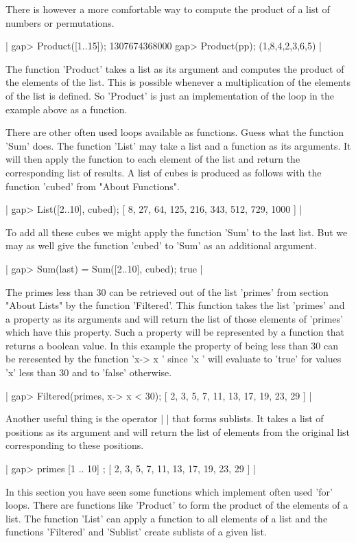 There is however a more comfortable way to  compute the product of a list
of numbers or permutations.

|    gap> Product([1..15]);
    1307674368000
    gap> Product(pp);
    (1,8,4,2,3,6,5) |

The function  'Product'  takes a  list as  its argument and computes  the
product  of  the  elements  of the  list.   This  is possible whenever  a
multiplication of  the elements of the list is defined.  So  'Product' is
just an implementation of the loop in the example above as a function.

There are other often used loops available as functions.   Guess what the
function 'Sum' does.  The function 'List' may  take a list and a function
as its arguments.  It will then apply the function to each element of the
list  and return  the corresponding list of results.   A list of cubes is
produced as follows with the function 'cubed' from "About Functions".

|    gap> List([2..10], cubed);
    [ 8, 27, 64, 125, 216, 343, 512, 729, 1000 ] |

To add all these cubes  we might apply the  function  'Sum' to  the  last
list.  But we may  as well  give the  function  'cubed' to  'Sum'  as  an
additional argument.

|    gap> Sum(last) = Sum([2..10], cubed);
    true |

The primes  less  than 30  can be retrieved out of the list 'primes' from
section "About Lists" by  the function 'Filtered'.   This  function takes
the list 'primes' and a  property  as its arguments  and will return  the
list  of those  elements  of 'primes'  which have  this property.  Such a
property will be  represented by a function that returns a boolean value.
In this example  the property of being less than 30  can be reresented by
the  function 'x-> x '  since 'x ' will evaluate  to 'true' for
values 'x' less than 30 and to 'false' otherwise.

|    gap> Filtered(primes, x-> x < 30);
    [ 2, 3, 5, 7, 11, 13, 17, 19, 23, 29 ] |

Another useful thing is the operator |{ }| that forms sublists.  It takes
a list of  positions as its argument and will return the list of elements
from the original list corresponding to these positions.

|    gap> primes{ [1 .. 10] };
    [ 2, 3, 5, 7, 11, 13, 17, 19, 23, 29 ] |

In this section you have seen  some functions which implement  often used
'for' loops.  There are functions  like 'Product'  to form the product of
the elements of a list.  The function 'List' can apply  a function to all
elements of  a list  and  the functions  'Filtered'  and 'Sublist' create
sublists of a given list.

